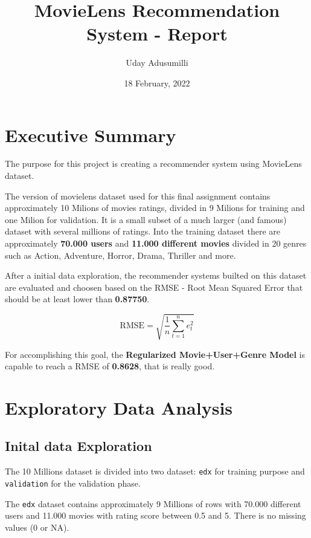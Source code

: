 \documentclass[
]{article}
\title{MovieLens Recommendation System - Report}
\author{Uday Adusumilli}
\date{18 February, 2022}
\begin{document}
\maketitle

{
\setcounter{tocdepth}{2}
\tableofcontents
}
\newpage

\hypertarget{executive-summary}{%
\section{Executive Summary}\label{executive-summary}}

The purpose for this project is creating a recommender system using
MovieLens dataset.

The version of movielens dataset used for this final assignment contains
approximately 10 Milions of movies ratings, divided in 9 Milions for
training and one Milion for validation. It is a small subset of a much
larger (and famous) dataset with several millions of ratings. Into the
training dataset there are approximately \textbf{70.000 users} and
\textbf{11.000 different movies} divided in 20 genres such as Action,
Adventure, Horror, Drama, Thriller and more.

After a initial data exploration, the recommender systems builted on
this dataset are evaluated and choosen based on the RMSE - Root Mean
Squared Error that should be at least lower than \textbf{0.87750}.

\[\mbox{RMSE} = \sqrt{\frac{1}{n}\sum_{t=1}^{n}e_t^2}\]

For accomplishing this goal, the \textbf{Regularized Movie+User+Genre
Model} is capable to reach a RMSE of \textbf{0.8628}, that is really
good.

\hypertarget{exploratory-data-analysis}{%
\section{Exploratory Data Analysis}\label{exploratory-data-analysis}}

\hypertarget{inital-data-exploration}{%
\subsection{Inital data Exploration}\label{inital-data-exploration}}

The 10 Millions dataset is divided into two dataset: \texttt{edx} for
training purpose and \texttt{validation} for the validation phase.

The \texttt{edx} dataset contains approximately 9 Millions of rows with
70.000 different users and 11.000 movies with rating score between 0.5
and 5. There is no missing values (0 or NA).
\end{document}
